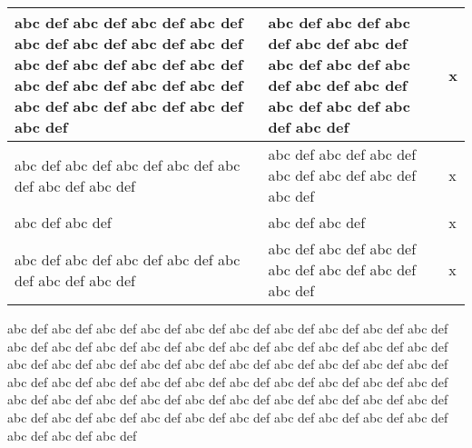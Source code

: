 \documentclass{article}
\def\watermark#1{%
		\setlength{\unitlength}{1pt}
		\begin{picture}(0,0) 
		\put(50,-35){\textcolor{red!50!white}{\Huge #1}}
		\end{picture}%
	}
\begin{document}
\begin{tabular}{p{3cm}p{3cm}l}
	\rotatebox[origin=c]{15}{\watermark{Revised}}
	abc def abc def abc def abc def abc def abc def abc def
	abc def abc def abc def abc def abc def abc def abc def
	abc def abc def abc def abc def abc def abc def abc def
	&
	abc def abc def abc def abc def abc def abc def abc def
	abc def abc def abc def abc def abc def abc def abc def
	& x
	\\
	\hline
	abc def abc def abc def abc def abc def abc def abc def
	&
	abc def abc def abc def abc def abc def abc def abc def
	& x
	\\
	\hline
	abc def abc def 
	&
	abc def abc def
	& x
	\\
	\hline
	abc def abc def abc def abc def abc def abc def abc def
	&
	abc def abc def abc def abc def abc def abc def abc def
	& x
\end{tabular}


\rotatebox[origin=c]{15}{\watermark{Revised}}
abc def abc def abc def abc def abc def abc def abc def
abc def abc def abc def abc def abc def abc def abc def
abc def abc def abc def abc def abc def abc def abc def
abc def abc def abc def abc def abc def abc def abc def
abc def abc def abc def abc def abc def abc def abc def
abc def abc def abc def abc def abc def abc def abc def
abc def abc def abc def abc def abc def abc def abc def
abc def abc def abc def abc def abc def abc def abc def
abc def abc def abc def abc def abc def abc def abc def
\end{document}
